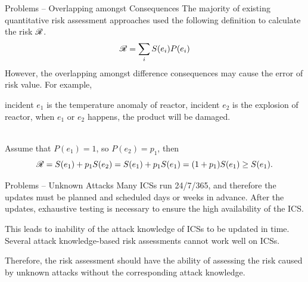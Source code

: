 \begin{frame}{Problems -- Overlapping amongst Consequences}\label{Introduction: Problem of Overlapping amongst Consequences}
    The majority of existing quantitative risk assessment approaches used the following definition to calculate the risk $\mathscr{R}$.
    \[
        \mathscr{R} = \sum_i S(e_i)P(e_i)
    \]
    However, the overlapping amongst difference consequences may cause the error of risk value. For example,
    \vspace{10pt}\\
    \begin{minipage}[l]{0.2\textwidth}
      
    \end{minipage}
    \begin{minipage}[l]{0.8\textwidth}
        incident $e_1$ is the temperature anomaly of reactor, incident $e_2$ is the explosion of reactor, when $e_1$ or $e_2$ happens, the product will be damaged.
    \end{minipage}
    \vspace{10pt}\\
    Assume that $P(e_1) = 1$, so $P(e_2) = p_1$, then
    \[
        \mathscr{R} = S(e_1) + p_1S(e_2) = S(e_1) + p_1S(e_1) = (1+p_1)S(e_1) \geq S(e_1)\text{.}
    \]
\end{frame}

\begin{frame}{Problems -- Unknown Attacks}\label{Introduction: Problem of Unknown Attacks}
    Many ICSs run 24/7/365, and therefore the updates must be planned and scheduled days or weeks in advance. After the updates, exhaustive testing is necessary to ensure the high availability of the ICS.

    This leads to inability of the attack knowledge of ICSs to be updated in time. Several attack knowledge-based risk assessments cannot work well on ICSs.

    Therefore, the risk assessment should have the ability of assessing the risk caused by unknown attacks without the corresponding attack knowledge.
\end{frame} 